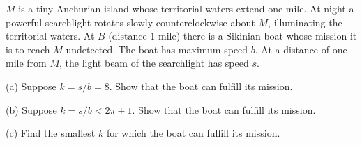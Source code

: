 $M$ is a tiny Anchurian island whose territorial waters extend one mile. At night a powerful searchlight rotates slowly counterclockwise about $M$, illuminating the territorial waters. At $B$ (distance $1$ mile) there is a Sikinian boat whose mission it is to reach $M$ undetected. The boat has maximum speed $b$. At a distance of one mile from $M$, the light beam of the searchlight has speed $s$.

(a) Suppose $k = s/b = 8$. Show that the boat can fulfill its mission.

(b) Suppose $k = s/b < 2\pi + 1$. Show that the boat can fulfill its mission.

(c) Find the smallest $k$ for which the boat can fulfill its mission.
